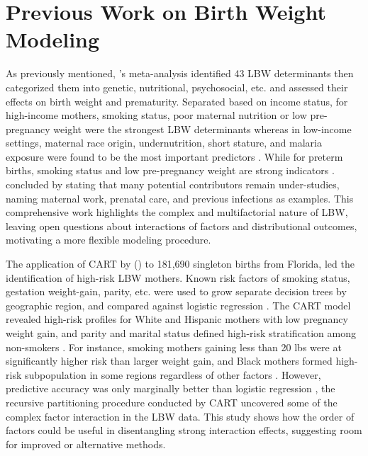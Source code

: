\section{Previous Work on Birth Weight Modeling}
\label{sec:ch2-previous-work}

As previously mentioned, \textcite{kramer1987}'s \citeyear{kramer1987} meta-analysis identified 43 LBW determinants then categorized them into genetic, nutritional, psychosocial, etc. and assessed their effects on birth weight and prematurity. Separated based on income status, for high-income mothers, smoking status, poor maternal nutrition or low pre-pregnancy weight were the strongest LBW determinants whereas in low-income settings, maternal race origin, undernutrition, short stature, and malaria exposure were found to be the most important predictors \parencite{kramer1987}. While for preterm births, smoking status and low pre-pregnancy weight are strong indicators \parencite{kramer1987}.  \textcite{kramer1987} concluded by stating that many potential contributors remain under-studies, naming maternal work, prenatal care, and previous infections as examples. This comprehensive work highlights the complex and multifactorial nature of LBW, leaving open questions about interactions of factors and distributional outcomes, motivating a more flexible modeling procedure.

The application of CART by \textcite{KITSANTAS2006275} (\citeyear{KITSANTAS2006275}) to 181,690 singleton births from Florida, led the identification of high-risk LBW mothers. Known risk factors of smoking status, gestation weight-gain, parity, etc. were used to grow separate decision trees by geographic region, and compared against logistic regression \parencite{KITSANTAS2006275}. The CART model revealed high-risk profiles for White and Hispanic mothers with low pregnancy weight gain, and parity and marital status defined high-risk stratification among non-smokers \parencite{KITSANTAS2006275}. For instance, smoking mothers gaining less than 20 lbs were at significantly higher risk than larger weight gain, and Black mothers formed high-risk subpopulation in some regions regardless of other factors \parencite{KITSANTAS2006275}. However, predictive accuracy was only marginally better than logistic regression \parencite{KITSANTAS2006275}, the recursive partitioning procedure conducted by CART uncovered some of the complex factor interaction in the LBW data. This study shows how the order of factors could be useful in disentangling strong interaction effects, suggesting room for improved or alternative methods. 

